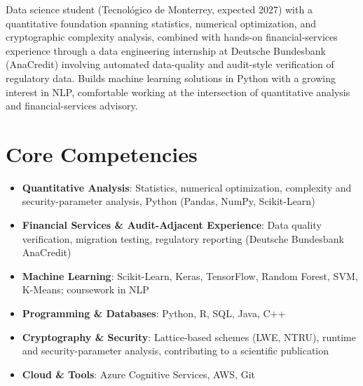 \documentclass[11pt,a4paper,sans]{moderncv}
\begin{document}
\makecvtitle


\vspace{6pt}
\small{Data science student (Tecnológico de Monterrey, expected 2027) with a quantitative foundation spanning statistics, numerical optimization, and cryptographic complexity analysis, combined with hands-on financial-services experience through a data engineering internship at Deutsche Bundesbank (AnaCredit) involving automated data-quality and audit-style verification of regulatory data. Builds machine learning solutions in Python with a growing interest in NLP, comfortable working at the intersection of quantitative analysis and financial-services advisory.}


\section{Core Competencies}
\vspace{1pt}
\begin{itemize}

\item \textbf{Quantitative Analysis}: Statistics, numerical optimization, complexity and security-parameter analysis, Python (Pandas, NumPy, Scikit-Learn)

\item \textbf{Financial Services \& Audit-Adjacent Experience}: Data quality verification, migration testing, regulatory reporting (Deutsche Bundesbank AnaCredit)

\item \textbf{Machine Learning}: Scikit-Learn, Keras, TensorFlow, Random Forest, SVM, K-Means; coursework in NLP

\item \textbf{Programming \& Databases}: Python, R, SQL, Java, C++

\item \textbf{Cryptography \& Security}: Lattice-based schemes (LWE, NTRU), runtime and security-parameter analysis, contributing to a scientific publication

\item \textbf{Cloud \& Tools}: Azure Cognitive Services, AWS, Git

\end{itemize}
\end{document}
